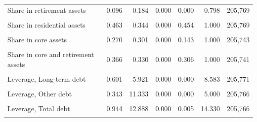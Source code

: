 \begin{table}[htbp]
\begin{tabular}{lrrrrrr}
Share in retirement assets & 0.096 & 0.184 & 0.000 & 0.000 & 0.798 & 205,769 \\\\
Share in residential assets & 0.463 & 0.344 & 0.000 & 0.454 & 1.000 & 205,769 \\\\
Share in core assets & 0.270 & 0.301 & 0.000 & 0.143 & 1.000 & 205,743 \\\\
Share in core and retirement assets & 0.366 & 0.330 & 0.000 & 0.306 & 1.000 & 205,741 \\\\
Leverage, Long-term debt & 0.601 & 5.921 & 0.000 & 0.000 & 8.583 & 205,771 \\\\
Leverage, Other debt & 0.343 & 11.333 & 0.000 & 0.000 & 5.000 & 205,766 \\\\
Leverage, Total debt & 0.944 & 12.888 & 0.000 & 0.005 & 14.330 & 205,766 \\\\
\bottomrule
\end{tabular}
\end{table}
